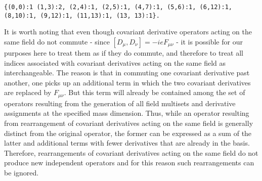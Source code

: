 \documentclass[11pt,BCOR=5mm]{article}
\begin{document}
\begin{lstlisting}[numbers=none, basicstyle=\footnotesize]
{(0,0):1 (1,3):2, (2,4):1, (2,5):1, (4,7):1, (5,6):1, (6,12):1, (8,10):1, (9,12):1, (11,13):1, (13, 13):1}.
\end{lstlisting}

 \noindent It is worth noting that even though covariant derivative operators acting on the same field do not commute - since $[D_{\mu}, D_{\nu}] = -ie F_{\mu \nu}$ - it is possible for our purposes here to treat them as if they do commute, and therefore to treat all indices associated with covariant derivatives acting on the same field as interchangeable. The reason is  that in commuting one covariant derivative past another, one picks up an additional term in which the two covariant derivatives are replaced by $F_{\mu \nu}$. But this term will already be contained among the set of operators resulting from the generation of all field multisets and derivative assignments at the specified mass dimension. Thus, while an operator resulting from rearrangement of covariant derivatives acting on the same field is generally distinct from the original operator, the former can be expressed as a sum of the latter and additional terms with fewer derivatives that are already in the basis. Therefore, rearrangements of covariant derivatives acting on the same field do not produce new independent operators and for this reason such rearrangements can be ignored. 
 
 
\end{document}
